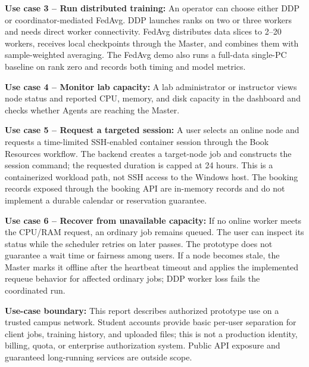 \documentclass{article}
\begin{document}
\textbf{Use case 3 -- Run distributed training:} An operator can choose either DDP or coordinator-mediated FedAvg. DDP launches ranks on two or three workers and needs direct worker connectivity. FedAvg distributes data slices to 2--20 workers, receives local checkpoints through the Master, and combines them with sample-weighted averaging. The FedAvg demo also runs a full-data single-PC baseline on rank zero and records both timing and model metrics.

\textbf{Use case 4 -- Monitor lab capacity:} A lab administrator or instructor views node status and reported CPU, memory, and disk capacity in the dashboard and checks whether Agents are reaching the Master.

\textbf{Use case 5 -- Request a targeted session:} A user selects an online node and requests a time-limited SSH-enabled container session through the Book Resources workflow. The backend creates a target-node job and constructs the session command; the requested duration is capped at 24 hours. This is a containerized workload path, not SSH access to the Windows host. The booking records exposed through the booking API are in-memory records and do not implement a durable calendar or reservation guarantee.

\textbf{Use case 6 -- Recover from unavailable capacity:} If no online worker meets the CPU/RAM request, an ordinary job remains queued. The user can inspect its status while the scheduler retries on later passes. The prototype does not guarantee a wait time or fairness among users. If a node becomes stale, the Master marks it offline after the heartbeat timeout and applies the implemented requeue behavior for affected ordinary jobs; DDP worker loss fails the coordinated run.

\textbf{Use-case boundary:} This report describes authorized prototype use on a trusted campus network. Student accounts provide basic per-user separation for client jobs, training history, and uploaded files; this is not a production identity, billing, quota, or enterprise authorization system. Public API exposure and guaranteed long-running services are outside scope.
	\pagebreak
\end{document}
